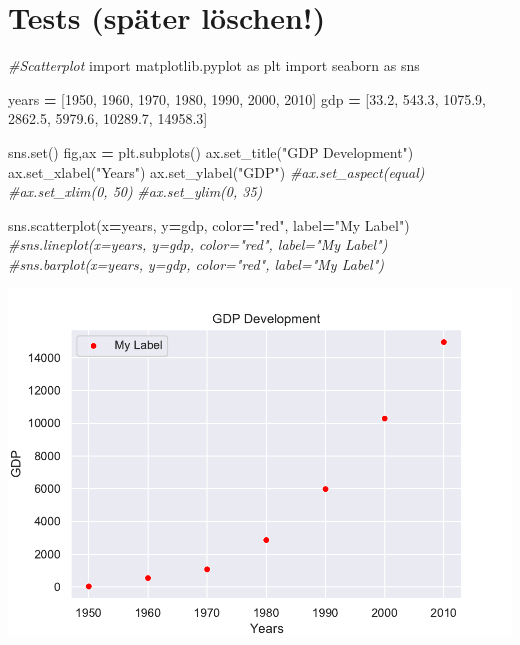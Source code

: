 \documentclass[
]{book}
\newenvironment{Shaded}{\begin{snugshade}}{\end{snugshade}}
\newcommand{\BuiltInTok}[1]{#1}
\newcommand{\CommentTok}[1]{\textcolor[rgb]{0.56,0.35,0.01}{\textit{#1}}}
\newcommand{\DecValTok}[1]{\textcolor[rgb]{0.00,0.00,0.81}{#1}}
\newcommand{\FloatTok}[1]{\textcolor[rgb]{0.00,0.00,0.81}{#1}}
\newcommand{\ImportTok}[1]{#1}
\newcommand{\NormalTok}[1]{#1}
\newcommand{\OperatorTok}[1]{\textcolor[rgb]{0.81,0.36,0.00}{\textbf{#1}}}
\newcommand{\StringTok}[1]{\textcolor[rgb]{0.31,0.60,0.02}{#1}}
\theoremstyle{definition}
\theoremstyle{definition}
\theoremstyle{definition}
\theoremstyle{definition}
\theoremstyle{remark}
\begin{document}
\hypertarget{tests-spuxe4ter-luxf6schen}{%
\section{Tests (später löschen!)}\label{tests-spuxe4ter-luxf6schen}}

\begin{Shaded}
\begin{Highlighting}[]
\CommentTok{\#Scatterplot}
\ImportTok{import}\NormalTok{ matplotlib.pyplot }\ImportTok{as}\NormalTok{ plt}
\ImportTok{import}\NormalTok{ seaborn }\ImportTok{as}\NormalTok{ sns}

\NormalTok{years }\OperatorTok{=}\NormalTok{ [}\DecValTok{1950}\NormalTok{, }\DecValTok{1960}\NormalTok{, }\DecValTok{1970}\NormalTok{, }\DecValTok{1980}\NormalTok{, }\DecValTok{1990}\NormalTok{, }\DecValTok{2000}\NormalTok{, }\DecValTok{2010}\NormalTok{]}
\NormalTok{gdp }\OperatorTok{=}\NormalTok{ [}\FloatTok{33.2}\NormalTok{, }\FloatTok{543.3}\NormalTok{, }\FloatTok{1075.9}\NormalTok{, }\FloatTok{2862.5}\NormalTok{, }\FloatTok{5979.6}\NormalTok{, }\FloatTok{10289.7}\NormalTok{, }\FloatTok{14958.3}\NormalTok{]}

\NormalTok{sns.}\BuiltInTok{set}\NormalTok{()}
\NormalTok{fig,ax }\OperatorTok{=}\NormalTok{ plt.subplots()}
\NormalTok{ax.set\_title(}\StringTok{"GDP Development"}\NormalTok{) }
\NormalTok{ax.set\_xlabel(}\StringTok{"Years"}\NormalTok{)}
\NormalTok{ax.set\_ylabel(}\StringTok{"GDP"}\NormalTok{)}
\CommentTok{\#ax.set\_aspect(\textquotesingle{}equal\textquotesingle{})}
\CommentTok{\#ax.set\_xlim(0, 50)}
\CommentTok{\#ax.set\_ylim(0, 35)}

\NormalTok{sns.scatterplot(x}\OperatorTok{=}\NormalTok{years, y}\OperatorTok{=}\NormalTok{gdp, color}\OperatorTok{=}\StringTok{"red"}\NormalTok{, label}\OperatorTok{=}\StringTok{"My Label"}\NormalTok{)          }
\CommentTok{\#sns.lineplot(x=years, y=gdp, color="red", label="My Label")            }
\CommentTok{\#sns.barplot(x=years, y=gdp, color="red", label="My Label")  }
\end{Highlighting}
\end{Shaded}

\includegraphics{index_files/figure-latex/unnamed-chunk-1-1.pdf}
\end{document}
